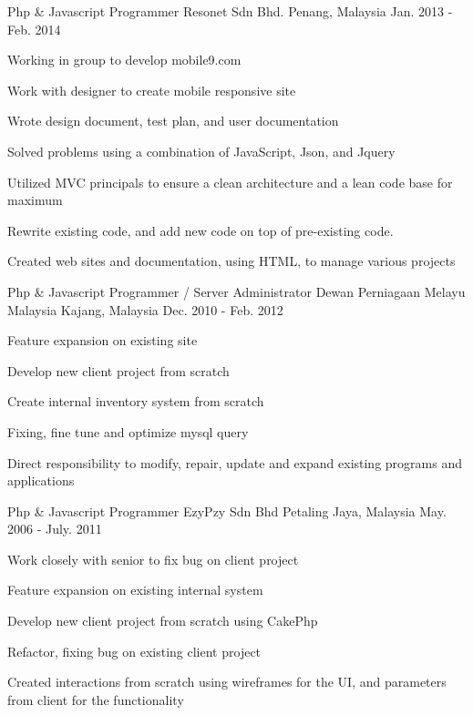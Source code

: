 \begin{cventries}
  \cventry
    {Php \& Javascript Programmer} %
    {Resonet Sdn Bhd.} %
    {Penang, Malaysia} %
    {Jan. 2013 - Feb. 2014} %
    {
      \begin{cvitems} %
        \item Working in group to develop mobile9.com
        \item Work with designer to create mobile responsive site
        \item Wrote design document, test plan, and user documentation
        \item Solved problems using a combination of JavaScript, Json, and Jquery
        \item Utilized MVC principals to ensure a clean architecture and a lean code base for maximum
        \item Rewrite existing code, and add new code on top of pre-existing code.
        \item Created web sites and documentation, using HTML, to manage various projects
      \end{cvitems}
    }

  \cventry
    {Php \& Javascript Programmer / Server Administrator} %
    {Dewan Perniagaan Melayu Malaysia} %
    {Kajang, Malaysia} %
    {Dec. 2010 - Feb. 2012} %
    {
      \begin{cvitems} %
        \item Feature expansion on existing site
        \item Develop new client project from scratch
        \item Create internal inventory system from scratch
        \item Fixing, fine tune and optimize mysql query
        \item Direct responsibility to modify, repair, update and expand existing programs and applications
      \end{cvitems}
    }


  \cventry
    {Php \& Javascript Programmer} %
    {EzyPzy Sdn Bhd} %
    {Petaling Jaya, Malaysia} %
    {May. 2006 - July. 2011} %
    {
      \begin{cvitems} %
      	\item Work closely with senior to fix bug on client project
      	\item Feature expansion on existing internal system
      	\item Develop new client project from scratch using CakePhp
        \item Refactor, fixing bug on existing client project
        \item Created interactions from scratch using wireframes for the UI, and parameters from client for the functionality
      \end{cvitems}
    }


\end{cventries}
